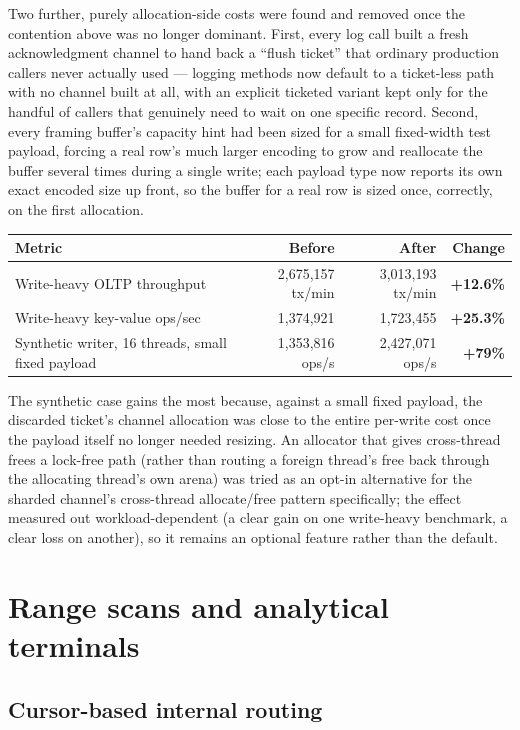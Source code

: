 \documentclass[11pt]{article}
\begin{document}
Two further, purely allocation-side costs were found and removed once the
contention above was no longer dominant. First, every log call built a fresh
acknowledgment channel to hand back a ``flush ticket'' that ordinary production
callers never actually used --- logging methods now default to a ticket-less path
with no channel built at all, with an explicit ticketed variant kept only for the
handful of callers that genuinely need to wait on one specific record. Second, every
framing buffer's capacity hint had been sized for a small fixed-width test payload,
forcing a real row's much larger encoding to grow and reallocate the buffer several
times during a single write; each payload type now reports its own exact encoded
size up front, so the buffer for a real row is sized once, correctly, on the first
allocation.

\begin{center}
\begin{tabular}{lrrr}
\toprule
Metric & Before & After & Change \\
\midrule
Write-heavy OLTP throughput & 2,675,157 tx/min & 3,013,193 tx/min & \textbf{+12.6\%} \\
Write-heavy key-value ops/sec & 1,374,921 & 1,723,455 & \textbf{+25.3\%} \\
Synthetic writer, 16 threads, small fixed payload & 1,353,816 ops/s & 2,427,071 ops/s & \textbf{+79\%} \\
\bottomrule
\end{tabular}
\end{center}

The synthetic case gains the most because, against a small fixed payload, the
discarded ticket's channel allocation was close to the entire per-write cost once the
payload itself no longer needed resizing. An allocator that gives cross-thread frees
a lock-free path (rather than routing a foreign thread's free back through the
allocating thread's own arena) was tried as an opt-in alternative for the sharded
channel's cross-thread allocate/free pattern specifically; the effect measured out
workload-dependent (a clear gain on one write-heavy benchmark, a clear loss on
another), so it remains an optional feature rather than the default.

\section{Range scans and analytical terminals}
\label{sec:scans}

\subsection{Cursor-based internal routing}
\end{document}
